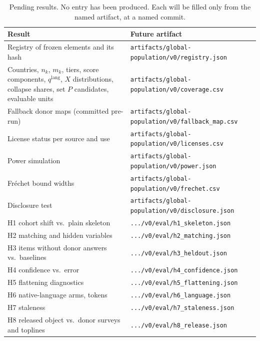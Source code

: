 \documentclass[10pt]{article}
\begin{document}
\begin{table}[!htbp]
\centering
\small
\caption{Pending results. No entry has been produced. Each will be filled only from the named artifact, at a named commit.}
\label{tab:pending}
\begin{tabular}{@{}L{5.0cm}L{8.6cm}@{}}
\toprule
Result & Future artifact \\
\midrule
Registry of frozen elements and its hash & \nolinkurl{artifacts/global-population/v0/registry.json} \\
Countries, $n_k$, $m_k$, tiers, score components, $q^{\text{lang}}$, $X$ distributions, collapse shares, set $P$ candidates, evaluable units & \nolinkurl{artifacts/global-population/v0/coverage.csv} \\
Fallback donor maps (committed pre-run) & \nolinkurl{artifacts/global-population/v0/fallback_map.csv} \\
License status per source and use & \nolinkurl{artifacts/global-population/v0/licenses.csv} \\
Power simulation & \nolinkurl{artifacts/global-population/v0/power.json} \\
Fréchet bound widths & \nolinkurl{artifacts/global-population/v0/frechet.csv} \\
Disclosure test & \nolinkurl{artifacts/global-population/v0/disclosure.json} \\
H1 cohort shift vs.\ plain skeleton & \nolinkurl{.../v0/eval/h1_skeleton.json} \\
H2 matching and hidden variables & \nolinkurl{.../v0/eval/h2_matching.json} \\
H3 items without donor answers vs.\ baselines & \nolinkurl{.../v0/eval/h3_heldout.json} \\
H4 confidence vs.\ error & \nolinkurl{.../v0/eval/h4_confidence.json} \\
H5 flattening diagnostics & \nolinkurl{.../v0/eval/h5_flattening.json} \\
H6 native-language arms, tokens & \nolinkurl{.../v0/eval/h6_language.json} \\
H7 staleness & \nolinkurl{.../v0/eval/h7_staleness.json} \\
H8 released object vs.\ donor surveys and toplines & \nolinkurl{.../v0/eval/h8_release.json} \\
\bottomrule
\end{tabular}
\end{table}
\end{document}
